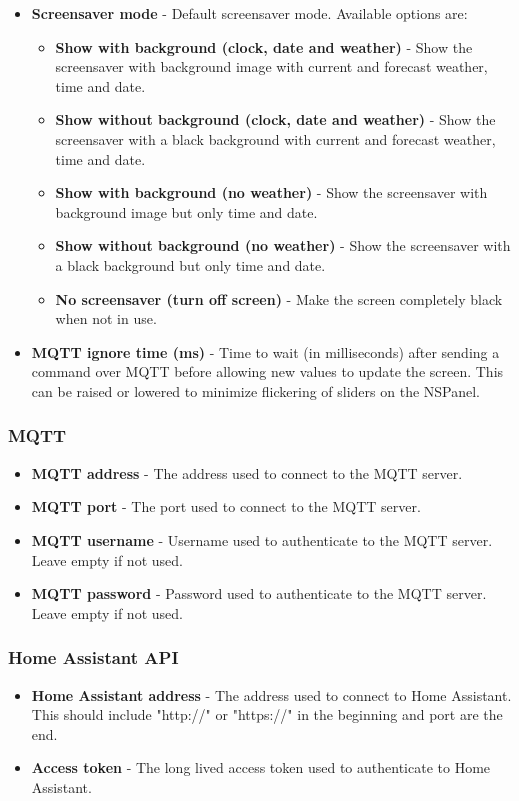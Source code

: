 \documentclass[10pt]{article}
\begin{document}
\begin{itemize}
      \item \textbf{Screensaver mode} - Default screensaver mode. Available options are:
      \begin{itemize}
        \item \textbf{Show with background (clock, date and weather)} - Show the screensaver with background image with current and forecast weather, time and date.
        \item \textbf{Show without background (clock, date and weather)} - Show the screensaver with a black background with current and forecast weather, time and date.
        \item \textbf{Show with background (no weather)} - Show the screensaver with background image but only time and date.
        \item \textbf{Show without background (no weather)} - Show the screensaver with a black background but only time and date.
        \item \textbf{No screensaver (turn off screen)} - Make the screen completely black when not in use.
      \end{itemize}
      \item \textbf{MQTT ignore time (ms)} - Time to wait (in milliseconds) after sending a command over MQTT before allowing new values to update the screen. This can be raised or lowered to minimize flickering of sliders on the NSPanel.
    \end{itemize}

    \subsubsection{MQTT}
    \begin{itemize}
      \item \textbf{MQTT address} - The address used to connect to the MQTT server.
      \item \textbf{MQTT port} - The port used to connect to the MQTT server.
      \item \textbf{MQTT username} - Username used to authenticate to the MQTT server. Leave empty if not used.
      \item \textbf{MQTT password} - Password used to authenticate to the MQTT server. Leave empty if not used.
    \end{itemize}

    \subsubsection{Home Assistant API}
    \begin{itemize}
      \item \textbf{Home Assistant address} - The address used to connect to Home Assistant. This should include "http://" or "https://" in the beginning and port are the end.
      \item \textbf{Access token} - The long lived access token used to authenticate to Home Assistant.
    \end{itemize}
\end{document}
